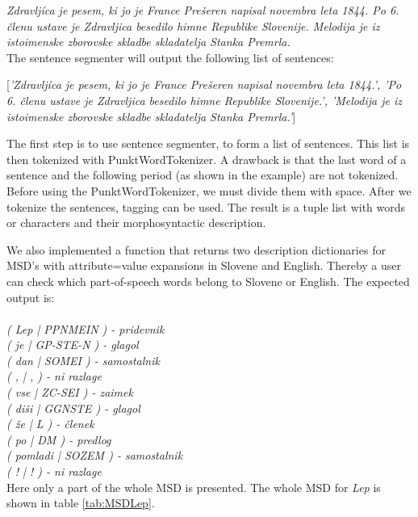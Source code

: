 \documentclass[10pt, conference, compsocconf]{IEEEtran}
\begin{document}
\begin{itemize}
\textit{Zdravljíca je pesem, ki jo je France Prešeren napisal novembra leta 1844. Po 6. členu ustave je Zdravljica besedilo himne Republike Slovenije. Melodija je iz istoimenske zborovske skladbe skladatelja Stanka Premrla.}\\

The sentence segmenter will output the following list of sentences:

[\textit{'Zdravljíca je pesem, ki jo je France Prešeren napisal novembra leta 1844.', 'Po 6. členu ustave je Zdravljica besedilo himne Republike Slovenije.', 'Melodija je iz istoimenske zborovske skladbe skladatelja Stanka Premrla.'}]
\end{itemize} 


The first step is to use sentence segmenter, to form a list of sentences. This list is then tokenized with PunktWordTokenizer. A drawback is that the last word of a sentence and the following period (as shown in the example) are not tokenized. Before using the PunktWordTokenizer, we must divide them with space. After we tokenize the sentences, tagging can be used. The result is a tuple list with words or characters and their morphosyntactic description. 

We also implemented a function that returns two description dictionaries for MSD's with attribute=value expansions in Slovene and English. Thereby a user can check which part-of-speech words belong to Slovene or English. The expected output is:
\\\\
\textit{( Lep  |  PPNMEIN ) - pridevnik \\
	( je  |  GP-STE-N ) - glagol\\
	( dan  |  SOMEI ) - samostalnik\\
	( ,  |  , ) - ni razlage\\
	( vse  |  ZC-SEI ) - zaimek\\
	( diši  |  GGNSTE ) - glagol\\
	( že  |  L ) - členek\\
	( po  |  DM ) - predlog\\
	( pomladi  |  SOZEM ) - samostalnik\\
	( !  |  ! ) - ni razlage}\\

Here only a part of the whole MSD is presented. The whole MSD for \textit{Lep} is shown in table \ref{tab:MSDLep}.
\end{document}
